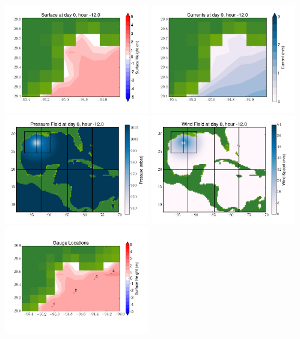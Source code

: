 \documentclass[11pt]{article}
\begin{document}
\includegraphics[width=0.475\textwidth]{frame0010fig6.png}
\vskip 10pt 
\includegraphics[width=0.475\textwidth]{frame0010fig7.png}
\includegraphics[width=0.475\textwidth]{frame0010fig8.png}
\vskip 10pt 
\includegraphics[width=0.475\textwidth]{frame0010fig9.png}
\includegraphics[width=0.475\textwidth]{frame0010fig10.png}
\end{document}
